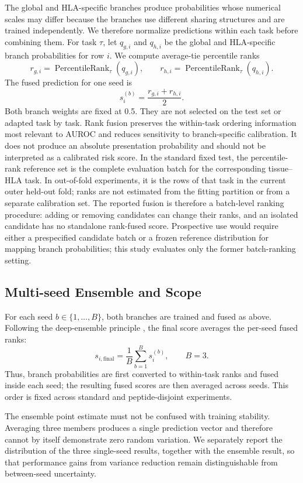 The global and HLA-specific branches produce probabilities whose numerical scales may differ because the branches use different sharing structures and are trained independently. We therefore normalize predictions within each task before combining them. For task \(\tau\), let \(q_{g,i}\) and \(q_{h,i}\) be the global and HLA-specific branch probabilities for row \(i\). We compute average-tie percentile ranks
\[
r_{g,i}
=
\operatorname{PercentileRank}_{\tau}(q_{g,i}),
\qquad
r_{h,i}
=
\operatorname{PercentileRank}_{\tau}(q_{h,i}).
\]
The fused prediction for one seed is
\[
s_i^{(b)}
=
\frac{r_{g,i}+r_{h,i}}{2}.
\]
Both branch weights are fixed at 0.5. They are not selected on the test set or adapted task by task. Rank fusion preserves the within-task ordering information most relevant to AUROC and reduces sensitivity to branch-specific calibration. It does not produce an absolute presentation probability and should not be interpreted as a calibrated risk score. In the standard fixed test, the percentile-rank reference set is the complete evaluation batch for the corresponding tissue--HLA task. In out-of-fold experiments, it is the rows of that task in the current outer held-out fold; ranks are not estimated from the fitting partition or from a separate calibration set. The reported fusion is therefore a batch-level ranking procedure: adding or removing candidates can change their ranks, and an isolated candidate has no standalone rank-fused score. Prospective use would require either a prespecified candidate batch or a frozen reference distribution for mapping branch probabilities; this study evaluates only the former batch-ranking setting.

\subsection{Multi-seed Ensemble and Scope}

For each seed \(b\in\{1,\ldots,B\}\), both branches are trained and fused as above. Following the deep-ensemble principle \cite{lakshminarayanan2017deep}, the final score averages the per-seed fused ranks:
\[
s_{i,\mathrm{final}}
=
\frac{1}{B}
\sum_{b=1}^{B}
s_i^{(b)},
\qquad B=3.
\]
Thus, branch probabilities are first converted to within-task ranks and fused inside each seed; the resulting fused scores are then averaged across seeds. This order is fixed across standard and peptide-disjoint experiments.

The ensemble point estimate must not be confused with training stability. Averaging three members produces a single prediction vector and therefore cannot by itself demonstrate zero random variation. We separately report the distribution of the three single-seed results, together with the ensemble result, so that performance gains from variance reduction remain distinguishable from between-seed uncertainty.


